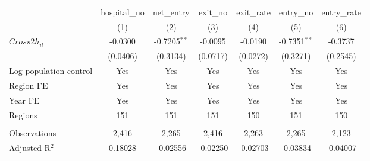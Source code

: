 \begingroup
\centering
\begin{tabular}{lcccccc}
   \toprule
                          & hospital\_no  & net\_entry     & exit\_no  & exit\_rate  & entry\_no      & entry\_rate \\    
                          & (1)           & (2)            & (3)       & (4)         & (5)            & (6)\\  
   \midrule 
   $Cross2h_{it}$         & -0.0300       & -0.7205$^{**}$ & -0.0095   & -0.0190     & -0.7351$^{**}$ & -0.3737\\   
                          & (0.0406)      & (0.3134)       & (0.0717)  & (0.0272)    & (0.3271)       & (0.2545)\\   
   Log population control & Yes           & Yes            & Yes       & Yes         & Yes            & Yes\\  
   Region FE              & Yes           & Yes            & Yes       & Yes         & Yes            & Yes\\  
   Year FE                & Yes           & Yes            & Yes       & Yes         & Yes            & Yes\\  
   Regions                & 151           & 151            & 151       & 150         & 151            & 150\\  
    \\
   Observations           & 2,416         & 2,265          & 2,416     & 2,263       & 2,265          & 2,123\\  
   Adjusted R$^2$         & 0.18028       & -0.02556       & -0.02250  & -0.02703    & -0.03834       & -0.04007\\  
   \bottomrule
\end{tabular}
\par\endgroup
